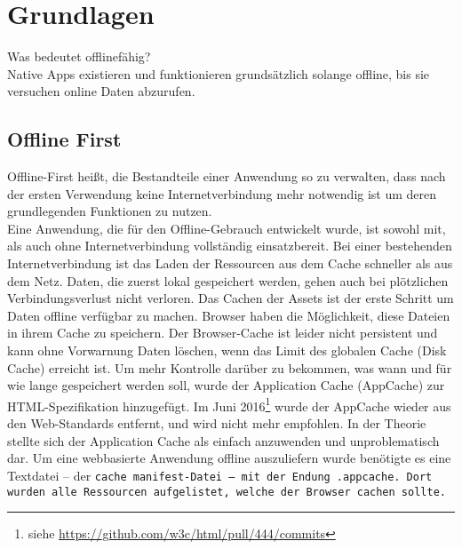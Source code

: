 \chapter{\label{chap:grundlagen}Grundlagen}
Was bedeutet offlinefähig?\\
Native \Glspl{App} existieren und funktionieren grundsätzlich solange offline, bis sie versuchen online Daten abzurufen.
%
%
\section{Offline First}
Offline-First heißt, die Bestandteile einer Anwendung so zu verwalten, dass nach der ersten Verwendung keine Internetverbindung mehr notwendig ist um deren grundlegenden Funktionen zu nutzen.\\
Eine Anwendung, die für den Offline-Gebrauch entwickelt wurde, ist sowohl mit, als auch ohne Internetverbindung vollständig einsatzbereit. Bei einer bestehenden Internetverbindung ist das Laden der Ressourcen aus dem Cache schneller als aus dem Netz. Daten, die zuerst lokal gespeichert werden, gehen auch bei plötzlichen Verbindungsverlust nicht verloren.
Das Cachen der \gls{Assets} ist der erste Schritt um Daten offline verfügbar zu machen. Browser haben die Möglichkeit, diese Dateien in ihrem Cache zu speichern. Der Browser-Cache ist leider nicht persistent und kann ohne Vorwarnung Daten löschen, wenn das Limit des globalen Cache (Disk Cache) erreicht ist.
Um mehr Kontrolle darüber zu bekommen, was wann und für wie lange gespeichert werden soll, wurde der Application Cache (AppCache) zur HTML-Spezifikation hinzugefügt.
Im Juni 2016\footnote{siehe \url{https://github.com/w3c/html/pull/444/commits}} wurde der AppCache wieder aus den Web-Standards entfernt, und wird nicht mehr empfohlen.
In der Theorie stellte sich der Application Cache als einfach anzuwenden und unproblematisch dar. Um eine webbasierte Anwendung offline auszuliefern wurde benötigte es eine Textdatei -- der \tt{cache manifest}-Datei -- mit der Endung \tt{.appcache}. Dort wurden alle Ressourcen aufgelistet, welche der Browser cachen sollte.

